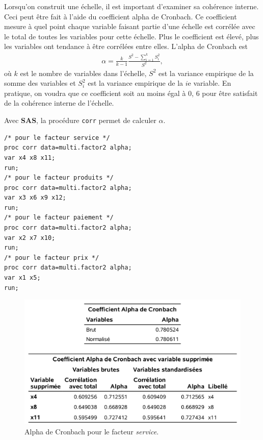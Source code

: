 \documentclass[
  11pt,
  letterpaper,
]{book}
\theoremstyle{definition}
\theoremstyle{definition}
\theoremstyle{definition}
\theoremstyle{remark}
\begin{document}
Lorsqu'on construit une échelle, il est important d'examiner sa cohérence interne. Ceci peut être fait à l'aide du coefficient alpha de Cronbach. Ce coefficient mesure à quel point chaque variable faisant partie d'une échelle est corrélée avec le total de toutes les variables pour cette échelle.
Plus le coefficient est élevé, plus les variables ont tendance à être corrélées entre elles. L'alpha de Cronbach est
\begin{align*}
\alpha=\frac{k}{k-1} \frac{S^2-\sum_{i=1}^k S_i^2}{S^2}, 
\end{align*}
où \(k\) est le nombre de variables dans l'échelle, \(S^2\) est la variance empirique de la somme des variables et \(S_i^2\) est la variance empirique de la \(i\)e variable. En pratique, on voudra que ce coefficient soit au moins égal à 0, 6 pour être satisfait de la cohérence interne de l'échelle.

Avec \textbf{SAS}, la procédure \texttt{corr} permet de calculer \(\alpha\).

\begin{verbatim}
/* pour le facteur service */
proc corr data=multi.factor2 alpha;
var x4 x8 x11;
run;
/* pour le facteur produits */
proc corr data=multi.factor2 alpha;
var x3 x6 x9 x12;
run;
/* pour le facteur paiement */
proc corr data=multi.factor2 alpha;
var x2 x7 x10;
run;
/* pour le facteur prix */
proc corr data=multi.factor2 alpha;
var x1 x5;
run;
\end{verbatim}









\begin{figure}

{\centering \includegraphics[width=0.85\linewidth]{figures/01-facto-e8} 

}

\caption{Alpha de Cronbach pour le facteur \emph{service}.}\label{fig:fig1p8}
\end{figure}
\end{document}
